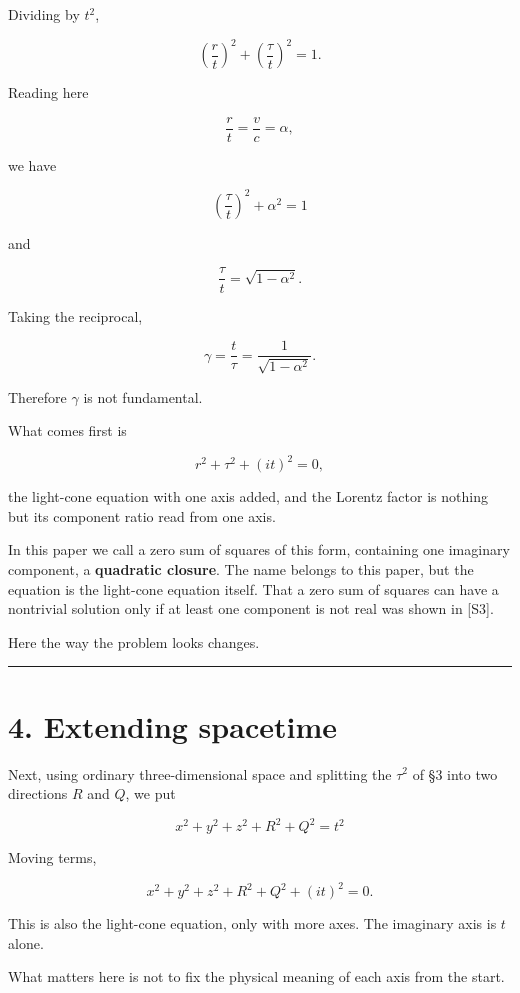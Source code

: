 \documentclass[
  a4paper,
]{article}
\begin{document}
Dividing by \(t^2\),

\[
\left(\frac rt\right)^2+
\left(\frac \tau t\right)^2=1.
\]

Reading here

\[
\frac rt=\frac vc=\alpha ,
\]

we have

\[
\boxed{
\left(\frac \tau t\right)^2+\alpha^2=1
}
\]

and

\[
\frac \tau t=\sqrt{1-\alpha^2}.
\]

Taking the reciprocal,

\[
\gamma=\frac t\tau
=\frac1{\sqrt{1-\alpha^2}} .
\]

Therefore \(\gamma\) is not fundamental.

What comes first is

\[
\boxed{r^2+\tau^2+(it)^2=0},
\]

the light-cone equation with one axis added, and the Lorentz factor is
nothing but its component ratio read from one axis.

In this paper we call a zero sum of squares of this form, containing one
imaginary component, a \textbf{quadratic closure}. The name belongs to
this paper, but the equation is the light-cone equation itself. That a
zero sum of squares can have a nontrivial solution only if at least one
component is not real was shown in {[}S3{]}.

Here the way the problem looks changes.

\begin{center}\rule{0.5\linewidth}{0.5pt}\end{center}

\section{4. Extending spacetime}\label{extending-spacetime}

Next, using ordinary three-dimensional space and splitting the
\(\tau^2\) of §3 into two directions \(R\) and \(Q\), we put

\[
\boxed{
x^2+y^2+z^2+R^2+Q^2=t^2
}
\]

Moving terms,

\[
x^2+y^2+z^2
+R^2+Q^2+(it)^2=0.
\]

This is also the light-cone equation, only with more axes. The imaginary
axis is \(t\) alone.

What matters here is not to fix the physical meaning of each axis from
the start.
\end{document}
